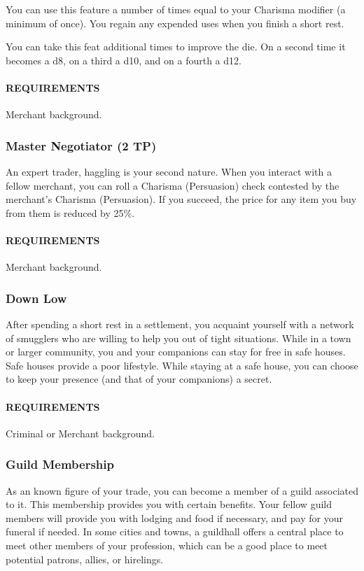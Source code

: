         You can use this feature a number of times equal to your Charisma modifier (a minimum of once).
        You regain any expended uses when you finish a short rest.

        You can take this feat additional times to improve the die.
        On a second time it becomes a d8, on a third a d10, and on a fourth a d12.
        \paragraph{REQUIREMENTS} Merchant background.

    \subsubsection{Master Negotiator (2 TP)} \label{feat::masternegotiator}
        An expert trader, haggling is your second nature.
        When you interact with a fellow merchant, you can roll a Charisma (Persuasion) check contested by the merchant's Charisma (Persuasion).
        If you succeed, the price for any item you buy from them is reduced by 25\%.
        \paragraph{REQUIREMENTS} Merchant background.

    \subsubsection{Down Low} \label{feat::downlow}
        After spending a short rest in a settlement, you acquaint yourself with a network of smugglers who are willing to help you out of tight situations.
        While in a town or larger community, you and your companions can stay for free in safe houses.
        Safe houses provide a poor lifestyle.
        While staying at a safe house, you can choose to keep your presence (and that of your companions) a secret.
        \paragraph{REQUIREMENTS} Criminal or Merchant background.

    \subsubsection{Guild Membership} \label{feat::guildmembership}
        As an known figure of your trade, you can become a member of a guild associated to it.
        This membership provides you with certain benefits.
        Your fellow guild members will provide you with lodging and food if necessary, and pay for your funeral if needed.
        In some cities and towns, a guildhall offers a central place to meet other members of your profession, which can be a good place to meet potential patrons, allies, or hirelings.

